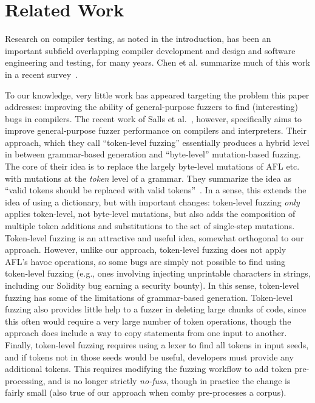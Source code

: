 \section{Related Work}

Research on compiler testing, as noted in the introduction, has been an important subfield overlapping compiler development and design and software engineering and testing, for many years.  Chen et al. summarize much of this work in a recent survey~\cite{chen2020survey}.

To our knowledge, very little work has appeared targeting the problem this paper addresses: improving the ability of general-purpose fuzzers to find (interesting) bugs in compilers.  The recent work of Salls et al.~\cite{Salls2021TokenLevel}, however, specifically aims to improve general-purpose fuzzer performance on compilers and interpreters.  Their approach, which they call ``token-level fuzzing'' essentially produces a hybrid level in between grammar-based generation and ``byte-level'' mutation-based fuzzing.  The core of their idea is to replace the largely byte-level mutations of AFL etc. with mutations at the \emph{token} level of a grammar.  They summarize the idea as ``valid tokens should be replaced with valid tokens''~\cite{Salls2021TokenLevel}.  In a sense, this extends the idea of using a dictionary, but with important changes:  token-level fuzzing \emph{only} applies token-level, not byte-level mutations, but also adds the composition of multiple token additions and substitutions to the set of single-step mutations.  Token-level fuzzing is an attractive and useful idea, somewhat orthogonal to our approach.  However, unlike our approach, token-level fuzzing does not apply AFL's havoc operations, so some bugs are simply not possible to find using token-level fuzzing (e.g., ones involving injecting unprintable characters in strings, including our Solidity bug earning a security bounty).  In this sense, token-level fuzzing has some of the limitations of grammar-based generation.  Token-level fuzzing also provides little help to a fuzzer in deleting large chunks of code, since this often would require a very large number of token operations, though the approach does include a way to copy statements from one input to another.  Finally, token-level fuzzing requires using a lexer to find all tokens in input seeds, and if tokens not in those seeds would be useful, developers must provide any additional tokens.  This requires modifying the fuzzing workflow to add token pre-processing, and is no longer strictly \emph{no-fuss}, though in practice the change is fairly small (also true of our approach when comby pre-processes a corpus).